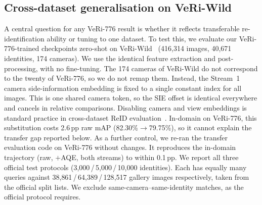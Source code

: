\subsection{Cross-dataset generalisation on VeRi-Wild}
\label{sec:veriwild}
A central question for any VeRi-776 result is whether it reflects transferable re-identification ability or tuning to one dataset. To test this, we evaluate our VeRi-776-trained checkpoints zero-shot on VeRi-Wild~\cite{lou2019veriwild} (416{,}314 images, 40{,}671 identities, 174 cameras). We use the identical feature extraction and post-processing, with no fine-tuning. The 174 cameras of VeRi-Wild do not correspond to the twenty of VeRi-776, so we do not remap them. Instead, the Stream~1 camera side-information embedding is fixed to a single constant index for all images. This is one shared camera token, so the SIE offset is identical everywhere and cancels in relative comparisons. Disabling camera and view embeddings is standard practice in cross-dataset ReID evaluation~\cite{benmabrouk2026genlimits}. In-domain on VeRi-776, this substitution costs 2.6\,pp raw mAP (82.30\%$\rightarrow$79.75\%), so it cannot explain the transfer gap reported below. As a further control, we re-ran the transfer evaluation code on VeRi-776 without changes. It reproduces the in-domain trajectory (raw, $+$AQE, both streams) to within 0.1\,pp. We report all three official test protocols (3{,}000\,/\,5{,}000\,/\,10{,}000 identities). Each has equally many queries against 38{,}861\,/\,64{,}389\,/\,128{,}517 gallery images respectively, taken from the official split lists. We exclude same-camera--same-identity matches, as the official protocol requires.

